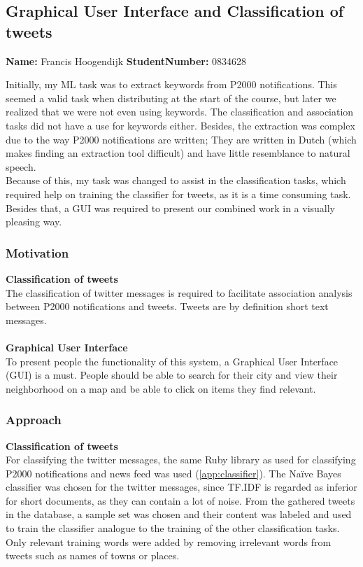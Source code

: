 \subsection{Graphical User Interface and Classification of tweets}
\textbf{Name:} Francis Hoogendijk \indent \textbf{StudentNumber:} 0834628

Initially, my ML task was to extract keywords from P2000 notifications. This seemed a valid task when distributing at the start of the course, but later we realized that we were not even using keywords. The classification and association tasks did not have a use for keywords either. Besides, the extraction was complex due to the way P2000 notifications are written; They are written in Dutch (which makes finding an extraction tool difficult) and have little resemblance to natural speech. \\

Because of this, my task was changed to assist in the classification tasks, which required help on training the classifier for tweets, as it is a time consuming task. Besides that, a GUI was required to present our combined work in a visually pleasing way.

\subsubsection*{Motivation}
\textbf{Classification of tweets}\\
The classification of twitter messages is required to facilitate association analysis between P2000 notifications and tweets. Tweets are by definition short text messages.\\
\\
\textbf{Graphical User Interface}\\
To present people the functionality of this system, a Graphical User Interface (GUI) is a must. People should be able to search for their city and view their neighborhood on a map and be able to click on items they find relevant. 
\subsubsection*{Approach}
\textbf{Classification of tweets}\\
For classifying the twitter messages, the same Ruby library as used for classifying P2000 notifications and news feed was used (\autoref{app:classifier}). The Na\"{i}ve Bayes classifier was chosen for the twitter messages, since TF.IDF is regarded as inferior for short documents, as they can contain a lot of noise. From the gathered tweets in the database, a sample set was chosen and their content was labeled and used to train the classifier analogue to the training of the other classification tasks. Only relevant training words were added by removing irrelevant words from tweets such as names of towns or places.\\

